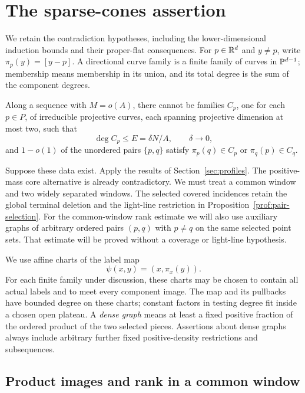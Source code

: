 \section{The sparse-cones assertion}\label{sec:sparse-cones}

We retain the contradiction hypotheses, including the
lower-dimensional induction bounds and their proper-flat
consequences.  For $p\in\mathbb R^d$ and $y\ne p$, write $\pi_p(y)=[y-p]$.
A directional curve family is a finite family of curves in
$\mathbb P^{d-1}$; membership means membership in its union, and its
total degree is the sum of the component degrees.

\begin{theorem}\label{sc:theorem}
Along a sequence with $M=o(A)$, there cannot be families $C_p$,
one for each $p\in P$, of irreducible projective curves, each
spanning projective dimension at most two, such that
\[
 \deg C_p\le E=\delta N/A,\qquad \delta\to0,
\]
and $1-o(1)$ of the unordered pairs $\{p,q\}$ satisfy
$\pi_p(q)\in C_p$ or $\pi_q(p)\in C_q$.
\end{theorem}

Suppose these data exist. Apply the results of Section~\ref{sec:profiles}.
The positive-mass core alternative is already contradictory.
We must treat a common window and two widely separated windows.
The selected covered incidences retain the global terminal deletion and
the light-line restriction in Proposition~\ref{prof:pair-selection}.
For the common-window rank estimate we will also use auxiliary graphs
of arbitrary ordered pairs $(p,q)$ with $p\ne q$ on the same selected point sets.
That estimate will be proved without a coverage or light-line hypothesis.

We use affine charts of the label map
\begin{equation}\label{sc:label-map}
 \psi(x,y)=(x,\pi_x(y)).
\end{equation}
For each finite family under discussion, these charts may be chosen to
contain all actual labels and to meet every component image.
The map and its pullbacks have bounded degree on these charts;
constant factors in testing degree fit inside a chosen open
plateau.  A \emph{dense graph} means at least a fixed positive
fraction of the ordered product of the two selected pieces.
Assertions about dense graphs always include arbitrary further
fixed positive-density restrictions and subsequences.

\subsection{Product images and rank in a common window}

